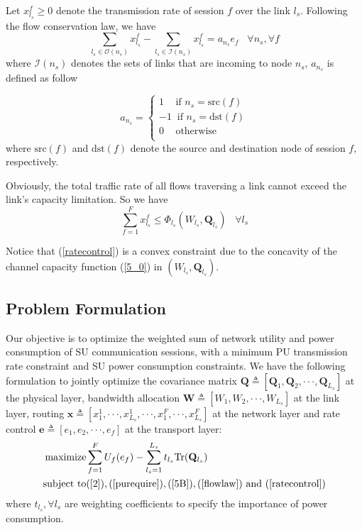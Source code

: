 \documentclass[12pt,onecolumn,tworows]{IEEEtran}
\begin{document}
 Let $x_{l_s}^f \geqslant 0$ denote the transmission rate of session $f$  over the link ${l_s}$. Following the flow conservation law, we have
 \begin{equation}\label{flowlaw}
 \sum\limits_{{l_s} \in \mathcal{O}({n_s})} {x_{l_s}^f - \sum\limits_{{l_s} \in \mathcal{I}({n_s})} {x_{{l_s}}^f = a_{n_s}e_f} \;\;\;\forall n_s, \forall f}
 \end{equation}
where $\mathcal{I}({n_s})$ denotes the sets of links that are incoming to node ${n_s}$, $a_{n_s}$ is defined as follow

\[{a_{{n_s}}} = \left\{ \begin{array}{l}
 1\;\;\;\text{ if } n_s=\text{src}(f) \\
 -1 \;\;\text{if } n_s=\text{dst}(f)\\
 0 \;\;\;\text{ otherwise}\\
 \end{array} \right.\]
where $\text{src}(f)$ and $\text{dst}(f)$ denote the source and destination node of session $f$, respectively.

Obviously, the total traffic rate of all flows traversing a link cannot exceed the
link's capacity limitation. So we have
\begin{equation}\label{ratecontrol}
\sum\limits_{f = 1}^F {x_{{l_s}}^f \leqslant {\Phi _{{l_s}}}({W_{{l_s}}},{{\mathbf{Q}}_{{l_s}}})\;\;\;\forall l_s}
\end{equation}

Notice that (\ref{ratecontrol}) is a convex constraint due to the concavity of the channel capacity function (\ref{5_0}) in $({W_{{l_s}}},{{\mathbf{Q}}_{{l_s}}})$.
\subsection{Problem Formulation}\label{ProblemFormulation}
Our objective is to optimize the weighted sum of network
utility and power consumption of SU communication
sessions, with a minimum PU transmission rate constraint
and SU power consumption constraints.
We have the following formulation to jointly optimize the covariance matrix $\mathbf{Q} \triangleq [\mathbf{Q}_1,\mathbf{Q}_2,\cdot\cdot\cdot,\mathbf{Q}_{L_s}]$ at the physical layer, bandwidth allocation $\mathbf{W} \triangleq [{W}_1,{W}_2,\cdot\cdot\cdot,{W}_{L_s}]$  at the link layer, routing $\mathbf{x} \triangleq [x_1^1,\cdot\cdot\cdot,x_{L_s}^1,\cdot\cdot\cdot,x_1^F,\cdot\cdot\cdot,x_{L_s}^F]$  at the network layer and rate control $\mathbf{e} \triangleq [e_1,e_2,\cdot\cdot\cdot,e_f]$  at the transport layer:
\begin{eqnarray}\label{6}
    \text{maximize}       &\sum\limits_{f = 1}^F {U_f({e_f}) - \sum\limits_{{l_s} = 1}^{L_s} {{t_{{l_s}}}\text{Tr}({{\mathbf{Q}}_{{l_s}}})} } \\
    \text{subject to}     &(\ref{2}),(\ref{purequire}),(\ref{5B}),(\ref{flowlaw})\text{ and }(\ref{ratecontrol}) \notag
\end{eqnarray}
where $t_{l_s}, \forall {l_s}$ are weighting coefficients to specify the importance of power consumption.
\end{document}
